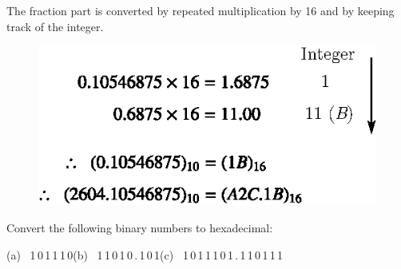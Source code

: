 \begin{solution}
\begin{itemize}
The fraction part is converted by repeated multiplication by 16 and by keeping track of the integer.
\begin{figure}[H]
\centering
\includegraphics[scale=1.1]{chap6/fig20.eps}
\end{figure}
\end{itemize}
\vskip -1cm
\end{solution}

\medskip

\begin{example}\label{exam6.11}
Convert the following binary numbers to hexadecimal:
\begin{center}
(a)~ 1\,0\,1\,1\,1\,0\qquad (b)~ 1\,1\,0\,1\,0\,.\,1\,0\,1\qquad (c)~ 1\,0\,1\,1\,1\,0\,1\,.\,1\,1\,0\,1\,1\,1
\end{center}
\end{example}


